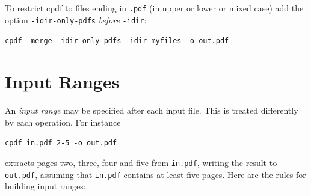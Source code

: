 \documentclass{book}
\begin{document}
To restrict cpdf to files ending in \texttt{.pdf} (in upper or lower or mixed case) add the option \texttt{-idir-only-pdfs} \textit{before} \texttt{-idir}:
  \begin{framed}
  \noindent\small\verb!cpdf -merge -idir-only-pdfs -idir myfiles -o out.pdf!
  \end{framed}


  \section{Input Ranges}
  An   \textit{input range} may be specified
after each input file. This is treated differently by each operation. For
instance
  \begin{framed}
  \noindent\small\verb!cpdf in.pdf 2-5 -o out.pdf!
  \end{framed}
  \noindent extracts pages two, three, four and five from \texttt{in.pdf},
writing the result to \texttt{out.pdf}, assuming that \texttt{in.pdf} contains
at least five pages.
  Here are the rules for building input ranges:
\end{document}
